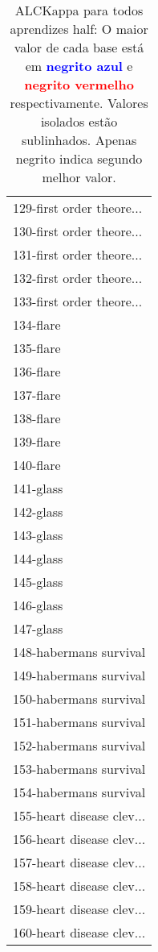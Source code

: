 \begin{table}[h]
\caption{ALCKappa para todos aprendizes half: O maior valor de cada base está em \textcolor{blue}{\textbf{negrito azul}} e \textcolor{red}{\textbf{negrito vermelho}} respectivamente. Valores isolados estão sublinhados. Apenas negrito indica segundo melhor valor.}
\begin{center}\begin{tabular}{l}
 & \\ \hline 129-first order theore... &  \\
130-first order theore... &  \\
131-first order theore... &  \\
132-first order theore... &  \\
133-first order theore... &  \\
134-flare &  \\
135-flare &  \\ \hline
136-flare &  \\
137-flare &  \\
138-flare &  \\
139-flare &  \\
140-flare &  \\
141-glass &  \\
142-glass &  \\ \hline
143-glass &  \\
144-glass &  \\
145-glass &  \\
146-glass &  \\
147-glass &  \\
148-habermans survival &  \\
149-habermans survival &  \\ \hline
150-habermans survival &  \\
151-habermans survival &  \\
152-habermans survival &  \\
153-habermans survival &  \\
154-habermans survival &  \\
155-heart disease clev... &  \\
156-heart disease clev... &  \\ \hline
157-heart disease clev... &  \\
158-heart disease clev... &  \\
159-heart disease clev... &  \\
160-heart disease clev... &  \\\end{tabular}\label{stratsALCKappa4AllReduxHalfb}
\end{center}
\end{table}
